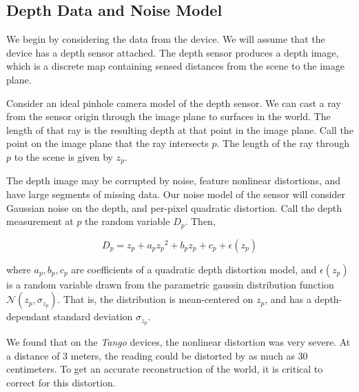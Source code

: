 \documentclass[conference,10pt]{IEEEtran}
\begin{document}
\subsection{Depth Data and Noise Model}
\label{subsection:calibration}
We begin by considering the data from the device. We will assume that the device
has a depth sensor attached. The depth sensor produces a depth image, which is
a discrete map containing sensed distances from the scene to the image plane.

Consider an ideal pinhole camera model of the depth sensor. We can cast a ray
from the sensor origin through the image plane to surfaces in the world. The
length of that ray is the resulting depth at that point in the image plane. Call
the point on the image plane that the ray intersects $p$. The length of the ray
through $p$ to the scene is given by $z_p$. 

The depth image may be corrupted by noise, feature nonlinear distortions, and
have large segments of missing data. Our noise model of the sensor will consider
Gaussian noise on the depth, and per-pixel quadratic distortion. Call the depth
 measurement at $p$ the random variable $D_p$. Then,
 
 $$ D_p = z_p + a_p{z_p}^2 + b_p z_p + c_p + \epsilon(z_p)$$
 
 \noindent where $a_p, b_p, c_p$ are coefficients of a quadratic depth
 distortion model, and $\epsilon(z_p)$ is a random variable drawn from the
 parametric gaussin distribution function $\mathcal{N}(z_p, \sigma_{z_p})$. 
 That is, the distribution is mean-centered on $z_p$, and has a depth-dependant
 standard deviation $\sigma_{z_p}$.
 
 We found that on the \emph{Tango} \cite{Tango} devices, the nonlinear distortion
 was very severe. At a distance of 3 meters, the reading could be distorted by as much as
 30 centimeters. To get an accurate reconstruction of the world, it is critical
 to correct for this distortion.
 
\end{document}
